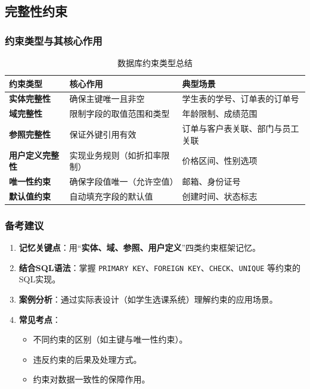 \documentclass[a4paper,12pt,UTF8,fontset=none]{ctexart}
\begin{document}
\subsection{完整性约束}
\subsubsection{约束类型与其核心作用}

\begin{table}[h!]
    \centering
    \caption{数据库约束类型总结}
    \begin{tabular}{@{}>{\centering\arraybackslash}m{4cm}%
                        >{\arraybackslash}m{5cm}%
                        >{\arraybackslash}m{6cm}@{}}
        \toprule
        \textbf{约束类型}     & \textbf{核心作用}         & \textbf{典型场景}                \\
        \midrule
        \textbf{实体完整性}   & 确保主键唯一且非空       & 学生表的学号、订单表的订单号     \\
        \textbf{域完整性}     & 限制字段的取值范围和类型 & 年龄限制、成绩范围               \\
        \textbf{参照完整性}   & 保证外键引用有效         & 订单与客户表关联、部门与员工关联 \\
        \textbf{用户定义完整性} & 实现业务规则（如折扣率限制） & 价格区间、性别选项               \\
        \textbf{唯一性约束}   & 确保字段值唯一（允许空值） & 邮箱、身份证号                   \\
        \textbf{默认值约束}   & 自动填充字段的默认值     & 创建时间、状态标志               \\
        \bottomrule
    \end{tabular}
    
\end{table}

\subsubsection{备考建议}

\begin{enumerate}
    \item \textbf{记忆关键点}：用“\textbf{实体、域、参照、用户定义}”四类约束框架记忆。
    \item \textbf{结合SQL语法}：掌握 \texttt{PRIMARY KEY}、\texttt{FOREIGN KEY}、\texttt{CHECK}、\texttt{UNIQUE} 等约束的SQL实现。
    \item \textbf{案例分析}：通过实际表设计（如学生选课系统）理解约束的应用场景。
    \item \textbf{常见考点}：
    \begin{itemize}
        \item 不同约束的区别（如主键与唯一性约束）。
        \item 违反约束的后果及处理方式。
        \item 约束对数据一致性的保障作用。
    \end{itemize}
\end{enumerate}
\end{document}
